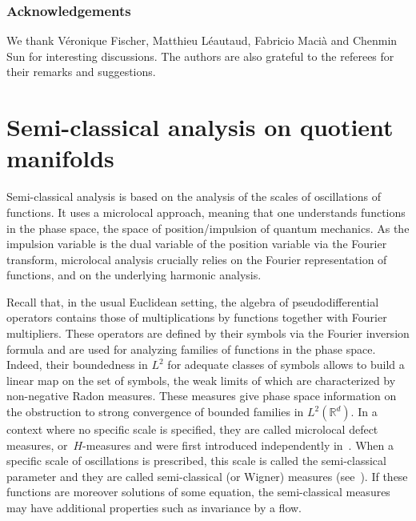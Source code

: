 \documentclass[10pt]{amsart}
\theoremstyle{plain}
\theoremstyle{definition}
\def\R{{\mathbb R}}
\begin{document}
\subsubsection*{Acknowledgements}
We thank Véronique Fischer, Matthieu Léautaud, Fabricio Macià and Chenmin Sun for interesting discussions. The authors are also grateful to the referees for their remarks and suggestions.

\section{Semi-classical analysis on quotient manifolds}\label{sec:semiclas}

Semi-classical analysis is based on the analysis of the scales of oscillations of functions. It uses a microlocal approach, meaning that one understands functions in the phase space, \ie the space of position/impulsion of quantum mechanics.
As the impulsion variable is the dual variable of the position variable via the Fourier transform, microlocal analysis crucially relies on the Fourier representation of functions, and on the underlying harmonic analysis.

Recall that, in the usual Euclidean setting, the algebra of pseudodifferential operators contains those of multiplications by functions together with Fourier multipliers. These operators are defined by their symbols via the Fourier inversion formula and are used for analyzing families of functions in the phase space. Indeed, their boundedness in $L^2$ for adequate classes of symbols allows to build a linear map on the set of symbols, the weak limits of which are characterized by non-negative Radon measures. These measures give phase space information on the obstruction to strong convergence of bounded families in $L^2(\R^d)$. In a context where no specific scale is specified, they are called microlocal defect measures, or~$H$-measures and were first introduced independently in~\cite{gerard_91,tartar}. When a specific scale of oscillations is prescribed, this scale is called the semi-classical parameter and they are called semi-classical (or Wigner) measures (see~\cite{HMR,gerard_X,gerardleichtnam,LP93,GMMP}).
If these functions are moreover solutions of some equation, the semi-classical measures may have additional properties such as invariance by a flow.
\end{document}
